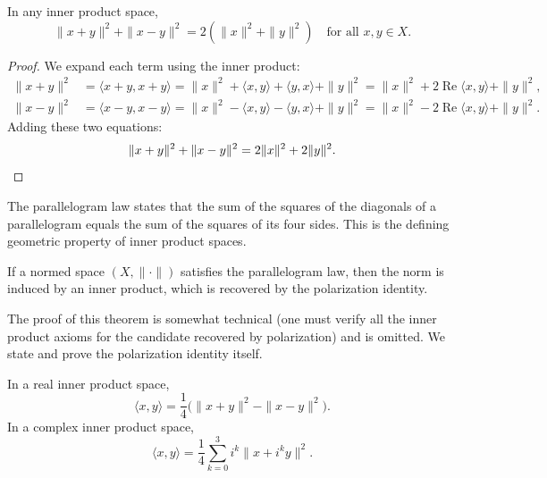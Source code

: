 \documentclass[11pt,a4paper]{article}
\begin{document}
\begin{theorem}
\label{thm:parallelogram}
In any inner product space,
\[
\|x + y\|^2 + \|x - y\|^2 = 2(\|x\|^2 + \|y\|^2)
\quad \text{for all } x, y \in X.
\]
\end{theorem}

\begin{proof}
We expand each term using the inner product:
\begin{align*}
\|x + y\|^2 &= \langle x + y, x + y \rangle
= \|x\|^2 + \langle x, y \rangle + \langle y, x \rangle + \|y\|^2
= \|x\|^2 + 2\operatorname{Re}\langle x, y \rangle + \|y\|^2, \\
\|x - y\|^2 &= \langle x - y, x - y \rangle
= \|x\|^2 - \langle x, y \rangle - \langle y, x \rangle + \|y\|^2
= \|x\|^2 - 2\operatorname{Re}\langle x, y \rangle + \|y\|^2.
\end{align*}
Adding these two equations:
\[
\|x + y\|^2 + \|x - y\|^2 = 2\|x\|^2 + 2\|y\|^2. \qedhere
\]
\end{proof}

\begin{remark}
\label{rem:parallelogram_geom}
The parallelogram law states that the sum of the squares of the diagonals of
a parallelogram equals the sum of the squares of its four sides. This is the
defining geometric property of inner product spaces.
\end{remark}

\begin{theorem}
\label{thm:jordan_vonneumann}
If a normed space $(X, \|\cdot\|)$ satisfies the parallelogram law, then
the norm is induced by an inner product, which is recovered by the
polarization identity.
\end{theorem}

The proof of this theorem is somewhat technical (one must verify all the
inner product axioms for the candidate recovered by polarization) and is
omitted. We state and prove the polarization identity itself.

\begin{proposition}
\label{prop:polarization}
In a real inner product space,
\begin{equation}
\label{eq:polar_real}
\langle x, y \rangle
= \frac{1}{4}\bigl(\|x + y\|^2 - \|x - y\|^2\bigr).
\end{equation}
In a complex inner product space,
\begin{equation}
\label{eq:polar_complex}
\langle x, y \rangle
= \frac{1}{4}\sum_{k=0}^{3} i^k \|x + i^k y\|^2.
\end{equation}
\end{proposition}
\end{document}
